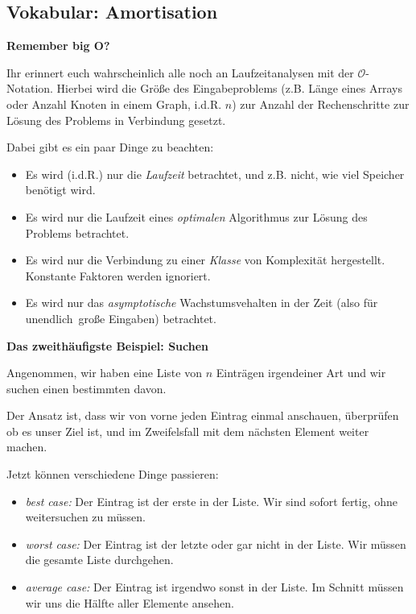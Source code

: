 \documentclass{beamer}
\begin{document}
\subsection{Vokabular: Amortisation}

\begin{frame}
\textbf{Remember big O?}
\bigskip

Ihr erinnert euch wahrscheinlich alle noch an Laufzeitanalysen mit der $\mathcal{O}$-Notation.
Hierbei wird die Größe des Eingabeproblems (z.B. Länge eines Arrays oder Anzahl Knoten in einem Graph, i.d.R. $n$) zur Anzahl der Rechenschritte zur Lösung des Problems in Verbindung gesetzt.
\pause
\bigskip

Dabei gibt es ein paar Dinge zu beachten:\pause

\begin{itemize}
\item Es wird (i.d.R.) nur die \emph{Laufzeit} betrachtet, und z.B. nicht, wie viel Speicher benötigt wird.\pause
\item Es wird nur die Laufzeit eines \emph{optimalen} Algorithmus zur Lösung des Problems betrachtet.\pause
\item Es wird nur die Verbindung zu einer \emph{Klasse} von Komplexität hergestellt. Konstante Faktoren werden ignoriert.\pause
\item Es wird nur das \emph{asymptotische} Wachstumsvehalten in der Zeit (also für \glqq unendlich\grqq\ große Eingaben) betrachtet.
\end{itemize}
\end{frame}


\begin{frame}
\textbf{Das zweithäufigste Beispiel: Suchen}
\bigskip

Angenommen, wir haben eine Liste von $n$ Einträgen irgendeiner Art und wir suchen einen bestimmten davon.

Der Ansatz ist, dass wir von vorne jeden Eintrag einmal anschauen, überprüfen ob es unser Ziel ist, und im Zweifelsfall mit dem nächsten Element weiter machen.
\pause
\bigskip

Jetzt können verschiedene Dinge passieren:\pause

\begin{itemize}
\item \emph{best case:} Der Eintrag ist der erste in der Liste. Wir sind sofort fertig, ohne weitersuchen zu müssen.\pause
\item \emph{worst case:} Der Eintrag ist der letzte oder gar nicht in der Liste. Wir müssen die gesamte Liste durchgehen.\pause
\item \emph{average case:} Der Eintrag ist irgendwo sonst in der Liste. Im Schnitt müssen wir uns die Hälfte aller Elemente ansehen.
\end{itemize}

\end{frame}
\end{document}
